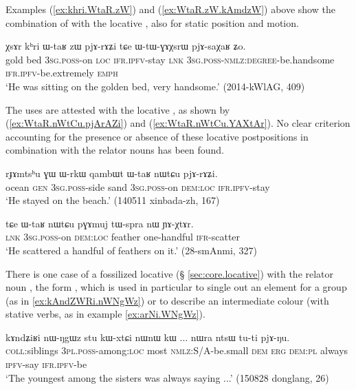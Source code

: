 Examples (\ref{ex:khri.WtaR.zW}) and (\ref{ex:WtaR.zW.kAmdzW}) above show the combination of  with the locative , also for static position and motion.

\begin{exe}
\ex \label{ex:khri.WtaR.zW}
\gll χsɤr kʰri ɯ-taʁ zɯ pjɤ-rɤʑi tɕe ɯ-tɯ-ɣɤχsrɯ pjɤ-saχaʁ ʑo. \\
gold bed \textsc{3sg}.\textsc{poss}-on \textsc{loc} \textsc{ifr}.\textsc{ipfv}-stay \textsc{lnk} \textsc{3sg}.\textsc{poss}-\textsc{nmlz}:\textsc{degree}-be.handsome \textsc{ifr}.\textsc{ipfv}-be.extremely \textsc{emph} \\
\glt `He was sitting on the golden bed, very handsome.' (2014-kWlAG, 409)
\end{exe}

The uses are attested with the locative , as shown by (\ref{ex:WtaR.nWtCu.pjArAZi}) and (\ref{ex:WtaR.nWtCu.YAXtAr}). No clear criterion accounting for the presence or absence of these locative postpositions in combination with the relator nouns has been found.

\begin{exe}
\ex \label{ex:WtaR.nWtCu.pjArAZi}
\gll  rɟɤmtsʰu ɣɯ ɯ-rkɯ qambɯt ɯ-taʁ nɯtɕu pjɤ-rɤʑi. \\
ocean \textsc{gen} \textsc{3sg}.\textsc{poss}-side sand \textsc{3sg}.\textsc{poss}-on \textsc{dem}:\textsc{loc} \textsc{ifr}.\textsc{ipfv}-stay \\
\glt `He stayed on the beach.' (140511 xinbada-zh, 167)
\end{exe}

\begin{exe}
\ex \label{ex:WtaR.nWtCu.YAXtAr}
\gll tɕe ɯ-taʁ nɯtɕu pɣɤmuj tɯ-spra nɯ ɲɤ-χtɤr. \\
\textsc{lnk} \textsc{3sg}.\textsc{poss}-on \textsc{dem}:\textsc{loc} feather one-handful \textsc{ifr}-scatter \\
\glt `He scattered a handful of feathers on it.' (28-smAnmi, 327)
\end{exe}

There is one case of a fossilized  locative (§ \ref{sec:core.locative}) with the relator noun , the form , which is used in particular to single out an element for a group (as in \ref{ex:kAndZWRi.nWNgWz}) or to describe an intermediate colour (with stative verbs, as in example \ref{ex:arNi.WNgWz}).

\begin{exe}
\ex \label{ex:kAndZWRi.nWNgWz} 
\gll kɤndʑiʁi nɯ-ŋgɯz stu kɯ-xtɕi nɯnɯ kɯ ... nɯra ntsɯ tu-ti pjɤ-ŋu. \\
\textsc{coll}:siblings \textsc{3pl}.\textsc{poss}-among:\textsc{loc} most \textsc{nmlz}:S/A-be.small \textsc{dem} \textsc{erg} { } \textsc{dem}:\textsc{pl} always \textsc{ipfv}-say \textsc{ifr}.\textsc{ipfv}-be \\
\glt `The youngest among the sisters was always saying ...' (150828 donglang, 26)
  \end{exe}
  
